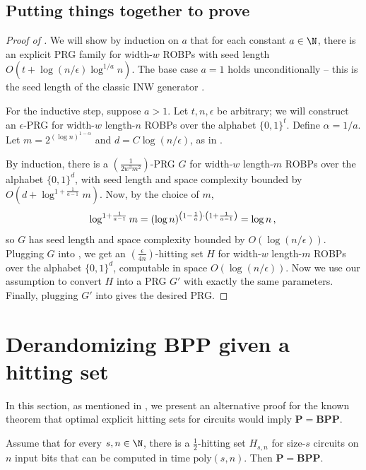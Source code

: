 \documentclass{toc}
\begin{document}
\subsection{Putting things together to prove }
\begin{proof}[Proof of ]
We will show by induction on $a$ that for each constant $a \in \N$, there is an explicit PRG family for width-$w$ ROBPs with seed length $O(t + \log(n/\epsilon) \log^{1/a} n)$. The base case $a = 1$ holds unconditionally -- this is the seed length of the classic INW generator \cite{INW94}.

For the inductive step, suppose $a > 1$. Let $t, n, \epsilon$ be arbitrary; we will construct an $\epsilon$-PRG for width-$w$ length-$n$ ROBPs over the alphabet $\{0, 1\}^t$. Define $\alpha = 1/a$. Let $m = 2^{(\log n)^{1 - \alpha}}$ and $d = C \log(n/\epsilon)$, as in .

By induction, there is a $(\frac{1}{2w^3 m^2})$-PRG $G$ for width-$w$ length-$m$ ROBPs over the alphabet $\{0, 1\}^d$, with seed length and space complexity bounded by $O(d + \log^{1 + \frac{1}{a - 1}} m)$. Now, by the choice of $m$,
$$
\log^{1 + \frac{1}{a - 1}} m = (\log n)^{\left(1 - \frac{1}{a}\right)\cdot \left(1 + \frac{1}{a - 1}\right)} = \log n\,, \\
$$
so $G$ has seed length and space complexity bounded by $O(\log(n/\epsilon))$. Plugging $G$ into , we get an $(\frac{\epsilon}{4n})$-hitting set $H$ for width-$w$ length-$m$ ROBPs over the alphabet $\{0, 1\}^d$, computable in space $O(\log(n/\epsilon))$. Now we use our assumption to convert $H$ into a PRG $G'$ with exactly the same parameters. Finally, plugging $G'$ into  gives the desired PRG.
\end{proof}

\section{Derandomizing $\mathbf{BPP}$ given a hitting set} \label{sec:bpp}

In this section, as mentioned in , we present an alternative proof for the known theorem that optimal explicit hitting sets for circuits would imply $\mathbf{P} = \mathbf{BPP}$.

\begin{theorem}
Assume that for every $s, n \in \N$, there is a $\frac{1}{2}$-hitting set $H_{s, n}$ for size-$s$ circuits on $n$ input bits that can be computed in time $\text{poly}(s, n)$. Then $\mathbf{P} = \mathbf{BPP}$.
\end{theorem}
\end{document}
